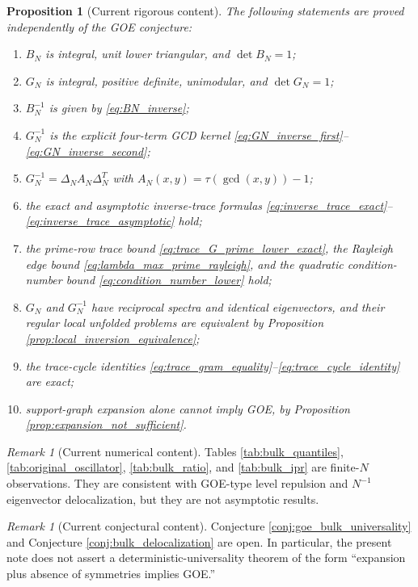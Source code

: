 \documentclass[11pt]{amsart}
\numberwithin{equation}{section}
\theoremstyle{plain}
\newtheorem{proposition}[theorem]{Proposition}
\theoremstyle{definition}
\theoremstyle{remark}
\newtheorem{remark}[theorem]{Remark}
\begin{document}
\begin{proposition}[Current rigorous content]
\label{prop:current_rigorous_content}
The following statements are proved independently of the GOE conjecture:
\begin{enumerate}[label=(\roman*)]
\item $B_N$ is integral, unit lower triangular, and $\det B_N=1$;
\item $G_N$ is integral, positive definite, unimodular, and $\det G_N=1$;
\item $B_N^{-1}$ is given by \eqref{eq:BN_inverse};
\item $G_N^{-1}$ is the explicit four-term GCD kernel \eqref{eq:GN_inverse_first}--\eqref{eq:GN_inverse_second};
\item $G_N^{-1}=\Delta_NA_N\Delta_N^T$ with $A_N(x,y)=\tau(\gcd(x,y))-1$;
\item the exact and asymptotic inverse-trace formulas \eqref{eq:inverse_trace_exact}--\eqref{eq:inverse_trace_asymptotic} hold;
\item the prime-row trace bound \eqref{eq:trace_G_prime_lower_exact}, the Rayleigh edge bound \eqref{eq:lambda_max_prime_rayleigh}, and the quadratic condition-number bound \eqref{eq:condition_number_lower} hold;
\item $G_N$ and $G_N^{-1}$ have reciprocal spectra and identical eigenvectors, and their regular local unfolded problems are equivalent by Proposition \ref{prop:local_inversion_equivalence};
\item the trace-cycle identities \eqref{eq:trace_gram_equality}--\eqref{eq:trace_cycle_identity} are exact;
\item support-graph expansion alone cannot imply GOE, by Proposition \ref{prop:expansion_not_sufficient}.
\end{enumerate}
\end{proposition}

\begin{remark}[Current numerical content]
\label{rem:current_numerical_content}
Tables \ref{tab:bulk_quantiles}, \ref{tab:original_oscillator}, \ref{tab:bulk_ratio}, and \ref{tab:bulk_ipr} are finite-$N$ observations.  They are consistent with GOE-type level repulsion and $N^{-1}$ eigenvector delocalization, but they are not asymptotic results.
\end{remark}

\begin{remark}[Current conjectural content]
\label{rem:current_conjectural_content}
Conjecture \ref{conj:goe_bulk_universality} and Conjecture \ref{conj:bulk_delocalization} are open.  In particular, the present note does not assert a deterministic-universality theorem of the form ``expansion plus absence of symmetries implies GOE.''
\end{remark}
\end{document}
